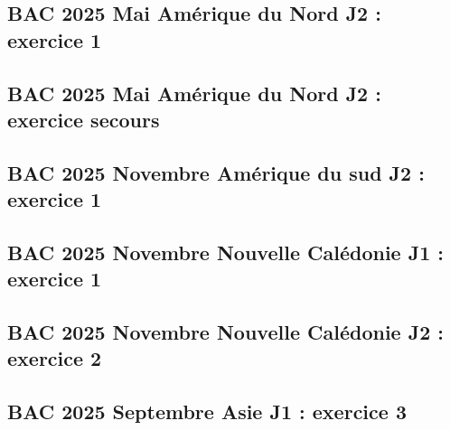\documentclass[lang=fr,edition=teacher,layout=sheet]{mxbook}
\begin{document}
\begingroup\endgroup
\par\bigskip
{}\subsection*{BAC 2025 Mai Amérique du Nord J2 : exercice 1}
\begingroup\endgroup
\par\bigskip
{}\subsection*{BAC 2025 Mai Amérique du Nord J2 : exercice secours}
\begingroup\endgroup
\par\bigskip
{}\subsection*{BAC 2025 Novembre Amérique du sud J2 : exercice 1}
\begingroup\endgroup
\par\bigskip
{}\subsection*{BAC 2025 Novembre Nouvelle Calédonie J1 : exercice 1}
\begingroup\endgroup
\par\bigskip
{}\subsection*{BAC 2025 Novembre Nouvelle Calédonie J2 : exercice 2}
\begingroup\endgroup
\par\bigskip
{}\subsection*{BAC 2025 Septembre Asie J1 : exercice 3}
\begingroup\endgroup
\par\bigskip
\end{document}
